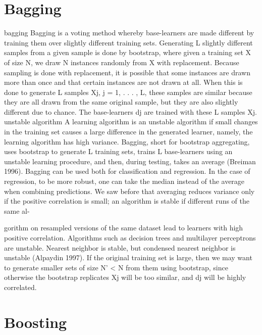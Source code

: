 \section{Bagging}

bagging Bagging is a voting method whereby base-learners are made different by training them over slightly different training sets. Generating L slightly different samples from a given sample is done by bootstrap, where given a training set X of size N, we draw N instances randomly from X with replacement. Because sampling is done with replacement, it is possible that some instances are drawn more than once and that certain instances are not drawn at all. When this is done to generate L samples Xj, j = 1, . . . , L, these samples are similar because they are all drawn from the same original sample, but they are also slightly different due to chance. The base-learners dj are trained with these L samples Xj. unstable algorithm A learning algorithm is an unstable algorithm if small changes in the training set causes a large difference in the generated learner, namely, the learning algorithm has high variance. Bagging, short for bootstrap aggregating, uses bootstrap to generate L training sets, trains L base-learners using an unstable learning procedure, and then, during testing, takes an average (Breiman 1996). Bagging can be used both for classification and regression. In the case of regression, to be more robust, one can take the median instead of the average when combining predictions. We saw before that averaging reduces variance only if the positive correlation is small; an algorithm is stable if different runs of the same al-

gorithm on resampled versions of the same dataset lead to learners with high positive correlation. Algorithms such as decision trees and multilayer perceptrons are unstable. Nearest neighbor is stable, but condensed nearest neighbor is unstable (Alpaydin 1997). If the original training set is large, then we may want to generate smaller sets of size N' < N from them using bootstrap, since otherwise the bootstrap replicates Xj will be too similar, and dj will be highly correlated.

\section{Boosting}

